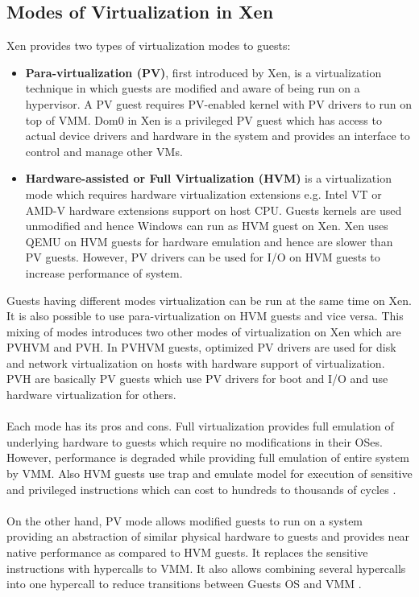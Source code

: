 \subsection{Modes of Virtualization in Xen \label{sec:guests}}
Xen provides two types of virtualization modes to guests:
\begin{itemize}
	\item  \textbf{Para-virtualization (PV)}, first introduced by Xen, is a virtualization technique in which guests are modified and aware of being run on a hypervisor. A PV guest requires PV-enabled kernel with PV drivers to run on top of VMM. Dom0 in Xen is a privileged PV guest which has access to actual device drivers and hardware in the system and provides an interface to control and manage other VMs.
	\item \textbf{ Hardware-assisted or Full Virtualization (HVM)} is a virtualization mode which requires hardware virtualization extensions e.g. Intel VT or AMD-V hardware extensions support on host CPU. Guests kernels are used unmodified and hence Windows can run as HVM guest on Xen. Xen uses QEMU on HVM guests for hardware emulation and hence are slower than PV guests. However, PV drivers can be used for I/O on HVM guests to increase performance of system.
\end{itemize}

Guests having different modes virtualization can be run at the same time on Xen. It is also possible to use para-virtualization on HVM guests and vice versa. This mixing of modes introduces two other modes of virtualization on Xen which are PVHVM and PVH. In PVHVM guests, optimized PV drivers are used for disk and network virtualization on hosts with hardware support of virtualization. PVH are basically PV guests which use PV drivers for boot and I/O and use hardware virtualization for others.
\\
\\
Each mode has its pros and cons. Full virtualization provides full emulation of underlying hardware to guests which require no modifications in their OSes. However, performance is degraded while providing full emulation of entire system by VMM. Also HVM guests use trap and emulate model for execution of sensitive and privileged instructions which can cost to hundreds to thousands of cycles \cite{wang2010dynamic}. 
\\
\\
On the other hand, PV mode allows modified guests to run on a system providing an abstraction of similar physical hardware to guests and provides near native performance as compared to HVM guests. It replaces the sensitive instructions with hypercalls to VMM. It also allows combining several hypercalls into one hypercall to reduce transitions between Guests OS and VMM \cite{wang2010dynamic}.

